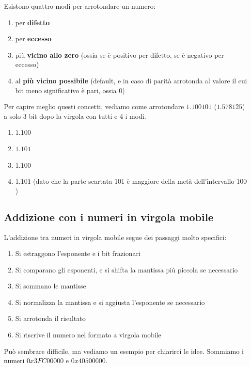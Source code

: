 \documentclass[11pt, a4paper, titlepage, oneside]{scrbook}
\begin{document}
\begin{Proprieta}[Arrotondare]
\label{prop-arrotondare}
Esistono quattro modi per arrotondare un numero:
\begin{enumerate}
    \item per \textbf{difetto}
    \item per \textbf{eccesso}
    \item più \textbf{vicino allo zero} (ossia se è positivo per difetto, se è negativo per eccesso)
    \item al \textbf{più vicino possibile} (default, e in caso di parità arrotonda al valore il cui bit meno significativo è pari, ossia 0)
\end{enumerate}
\end{Proprieta}

Per capire meglio questi concetti, vediamo come arrotondare $1.100101$ ($1.578125$) a solo 3 bit dopo la virgola con tutti e 4 i modi.

\begin{enumerate}
    \item $\bm{1.100}$
    \item $\bm{1.101}$
    \item $\bm{1.100}$
    \item $\bm{1.101}$ (dato che la parte scartata $101$ è maggiore della metà dell'intervallo $100$)
\end{enumerate}

\subsection{Addizione con i numeri in virgola mobile}

L'addizione tra numeri in virgola mobile segue dei passaggi molto specifici:
\begin{enumerate}[label=\arabic*°]
    \item Si estraggono l'esponente e i bit frazionari
    \item Si comparano gli esponenti, e si shifta la mantissa più piccola se necessario
    \item Si sommano le mantisse
    \item Si normalizza la mantissa e si aggiusta l'esponente se necessario
    \item Si arrotonda il risultato
    \item Si riscrive il numero nel formato a virgola mobile
\end{enumerate}

Può sembrare difficile, ma vediamo un esempio per chiarirci le idee. Sommiamo i numeri $0x3FC00000$ e $0x40500000$.
\end{document}

